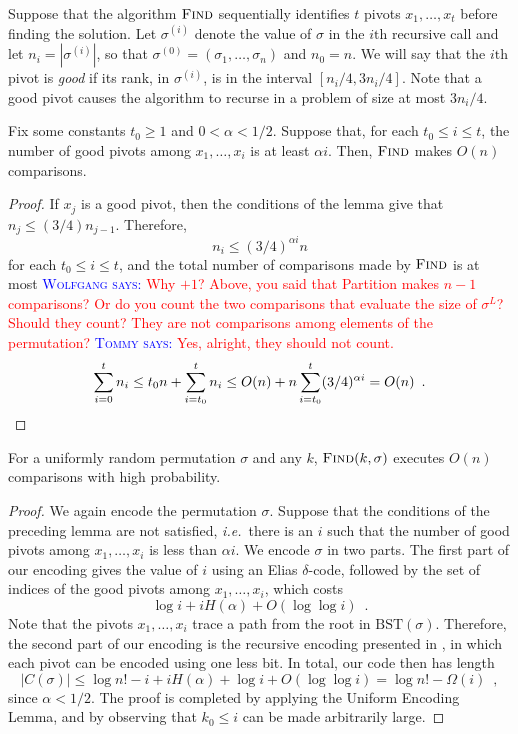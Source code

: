 \documentclass{patmorin}
\newcommand{\aremark}[3]{\textcolor{blue}{\textsc{#1 #2:}}
  \textcolor{red}{\textsf{#3}}}
\newcommand{\tommy}[2][says]{\aremark{Tommy}{#1}{#2}}
\newcommand{\wolfgang}[2][says]{\aremark{Wolfgang}{#1}{#2}}
\begin{document}
Suppose that the algorithm $\textsc{Find}$ sequentially identifies $t$
pivots $x_1, \dots, x_t$ before finding the solution. Let
$\sigma^{(i)}$ denote the value of $\sigma$ in the $i{\text{th}}$
recursive call and let $n_i=|\sigma^{(i)}|$, so that
$\sigma^{(0)}=(\sigma_1,\ldots,\sigma_n)$ and $n_0=n$.  We will say
that the $i{\text{th}}$ pivot is \emph{good} if its rank, in
$\sigma^{(i)}$, is in the interval $[n_i/4, 3n_i/4]$. Note that a good
pivot causes the algorithm to recurse in a problem of size at most
$3n_i/4$.

\begin{lem}
  Fix some constants $t_0 \geq 1$ and $0 < \alpha < 1/2$. Suppose
  that, for each $t_0 \leq i \leq t$, the number of good pivots among
  $x_1, \ldots, x_i$ is at least $\alpha i$. Then, $\textsc{Find}$
  makes $O(n)$ comparisons.
\end{lem}
\begin{proof}
  If $x_j$ is a good pivot, then the conditions of the lemma give
  that $n_j \le (3/4) n_{j - 1}$. Therefore,
  \[
  n_i \leq (3/4)^{\alpha i} n
  \]
  for each $t_0 \leq i \leq t$, and the total number of comparisons
  made by $\textsc{Find}$ is at most \wolfgang{Why $+1$? Above, you
    said that Partition makes $n-1$ comparisons? Or do you count the
    two comparisons that evaluate the size of $\sigma^L$? Should they
    count? They are not comparisons among elements of the
    permutation?} \tommy{Yes, alright, they should not count.}
  \[
    \sum_{i=0}^t n_i \le t_0 n + \sum_{i=t_0}^t n_i \le O(n) + n
    \sum_{i = t_0}^t (3/4)^{\alpha i} = O(n) \enspace . \qedhere
  \]
\end{proof}

\begin{thm}
  For a uniformly random permutation $\sigma$ and any $k$,
  $\textsc{Find}(k, \sigma)$ executes $O(n)$ comparisons with high
  probability.
\end{thm}
\begin{proof}
  We again encode the permutation $\sigma$. Suppose that the
  conditions of the preceding lemma are not satisfied,
  \emph{i.e.}~there is an $i$ such that the number of good pivots
  among $x_1, \dots, x_i$ is less than $\alpha i$. We encode $\sigma$
  in two parts. The first part of our encoding gives the value of $i$
  using an Elias $\delta$-code, followed by the set of indices of the
  good pivots among $x_1, \dots, x_i$, which costs
  \[
  \log i + i H(\alpha) + O(\log \log i) \enspace .
  \]
  Note that the pivots $x_1, \dots, x_i$ trace a path from the root in
  $\text{BST}(\sigma)$. Therefore, the second part of our encoding is
  the recursive encoding presented in , in which each
  pivot can be encoded using one less bit. In total, our code then has
  length
  \[
    |C(\sigma)| \le \log n! - i + i H(\alpha) + \log i + O(\log \log
    i) = \log n! - \varOmega(i) \enspace ,
  \]
  since $\alpha < 1/2$. The proof is completed by applying the Uniform
  Encoding Lemma, and by observing that $k_0 \leq i$ can be made
  arbitrarily large.
\end{proof}
\end{document}
